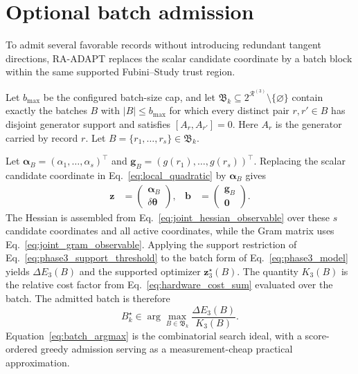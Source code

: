 \documentclass[
  reprint,
  amsmath,
  amssymb,
  aps,
  pra,
  nofootinbib,
  superscriptaddress,
  floatfix
]{revtex4-2}
\begin{document}
\section{Optional batch admission}
\label{app:batching}

To admit several favorable records without introducing redundant tangent
directions, \textsc{RA-ADAPT} replaces the scalar candidate coordinate by a
batch block within the same supported Fubini--Study trust region.

Let \(b_{\max}\) be the configured batch-size cap, and let
\(\mathfrak B_k\subseteq
2^{\mathcal R^{(3)}}\setminus\{\varnothing\}\) contain exactly the
batches \(B\) with \(|B|\le b_{\max}\) for which every distinct pair
\(r,r'\in B\) has disjoint generator support and satisfies
\([A_r,A_{r'}]=0\). Here \(A_r\) is the generator carried by record \(r\).
Let
\(B=\{r_1,\ldots,r_s\}\in\mathfrak B_k\).

Let
\(\boldsymbol\alpha_B=(\alpha_1,\ldots,\alpha_s)^{\top}\) and
\(\mathbf g_B=(g(r_1),\ldots,g(r_s))^{\top}\). Replacing the scalar candidate
coordinate in Eq.~\eqref{eq:local_quadratic} by \(\boldsymbol\alpha_B\) gives
\begin{equation*}
\begin{aligned}
\mathbf z&=
\begin{pmatrix}
\boldsymbol\alpha_B\\
\delta\boldsymbol\theta
\end{pmatrix},
&
\mathbf b&=
\begin{pmatrix}
\mathbf g_B\\
\mathbf 0
\end{pmatrix}.
\end{aligned}
\end{equation*}
The Hessian is assembled from Eq.~\eqref{eq:joint_hessian_observable} over these
\(s\) candidate coordinates and all active coordinates, while the Gram matrix
uses Eq.~\eqref{eq:joint_gram_observable}. Applying the support restriction of
Eq.~\eqref{eq:phase3_support_threshold} to the batch form of
Eq.~\eqref{eq:phase3_model} yields \(\Delta E_3(B)\) and the supported
optimizer \(\mathbf z_3^\star(B)\).
The quantity \(K_3(B)\) is the relative cost factor from
Eq.~\eqref{eq:hardware_cost_sum} evaluated over the batch. The admitted batch
is therefore
\begin{equation}
B_k^\star\in\arg\max_{B\in\mathfrak B_k}
\frac{\Delta E_3(B)}{K_3(B)}.
\label{eq:batch_argmax}
\end{equation}
Equation~\eqref{eq:batch_argmax} is the combinatorial search ideal, with a
score-ordered greedy admission serving as a measurement-cheap practical
approximation.
\end{document}
